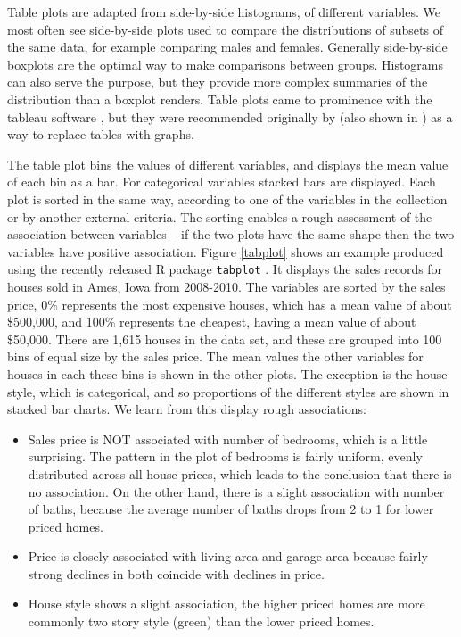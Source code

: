 \documentclass{article}
\begin{document}
\begin{itemize}
Table plots are adapted from side-by-side histograms, of different variables. We most often see side-by-side plots used to compare the distributions of subsets of the same data, for example comparing males and females. Generally side-by-side boxplots are the optimal way to make comparisons between groups. Histograms can also serve the purpose, but they provide more complex summaries of the distribution than a boxplot renders. Table plots came to prominence with the tableau software \citep{tableau}, but they were recommended originally by \citet{carr-grey} (also shown in \citet{carr-tabplot}) as a way to replace tables with graphs. 

The table plot bins the values of different variables, and displays the mean value of each bin as a bar. For categorical variables stacked bars are displayed. Each plot is sorted in the same way, according to one of the variables in the collection or by another external criteria. The sorting enables a rough assessment of the association between variables -- if the two plots have the same shape then the two variables have positive association. Figure \ref{tabplot} shows an example produced using the recently released R package {\tt tabplot} \citep{tennekes2012package}. It displays the sales records for houses sold in Ames, Iowa from 2008-2010. The variables are sorted by the sales price, 0\% represents the most expensive houses, which has a mean value of about \$500,000, and 100\% represents the cheapest, having a mean value of about \$50,000. There are 1,615 houses in the data set, and these are grouped into 100 bins of equal size by the sales price. The mean values the other variables for houses in each these bins is shown in the other plots. The exception is the house style, which is categorical, and so proportions of the different styles are shown in stacked bar charts. We learn from this display rough associations: 

\begin{itemize} \itemsep 0in
\item Sales price is NOT associated with number of bedrooms, which is a little surprising. The pattern in the plot of bedrooms is fairly uniform, evenly distributed across all house prices, which leads to the conclusion that there is no association. On the other hand, there is a slight association with number of baths, because the average number of baths drops from 2 to 1 for lower priced homes.  
\item Price is closely associated with living area and garage area because fairly strong declines in both coincide with declines in price. 
\item House style shows a slight association, the higher priced homes are more commonly two story style (green) than the lower priced homes. 
\end{itemize}


\end{itemize}
\end{document}
